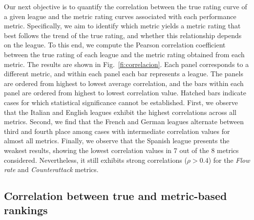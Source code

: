 \documentclass[preprint, amsmath,amssymb, pre]{revtex4-2}
\begin{document}
Our next objective is to quantify the correlation between the true rating curve of a given league and the metric rating curves associated with each performance metric. Specifically, we aim to identify which metric yields a metric rating that best follows the trend of the true rating, and whether this relationship depends on the league.
%
To this end, we compute the Pearson correlation coefficient between the true rating of each league and the metric rating obtained from each metric.
%
The results are shown in Fig.~\ref{fi:correlacion}. Each panel corresponds to a different metric, and within each panel each bar represents a league. The panels are ordered from highest to lowest average correlation, and the bars within each panel are ordered from highest to lowest correlation value. Hatched bars indicate cases for which statistical significance cannot be established.
%
First, we observe that the Italian and English leagues exhibit the highest correlations across all metrics.
Second, we find that the French and German leagues alternate between third and fourth place among cases with intermediate correlation values for almost all metrics.
Finally, we observe that the Spanish league presents the weakest results, showing the lowest correlation values in 7 out of the 8 metrics considered. Nevertheless, it still exhibits strong correlations ($\rho > 0.4$) for the {\it Flow rate} and {\it Counterattack} metrics.

\subsection{Correlation between true and metric-based rankings}
\label{sse:ken}
\end{document}
